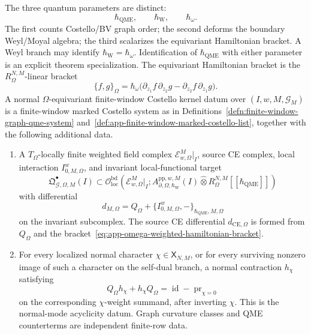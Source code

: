 \begin{defn}
  The three quantum parameters are distinct:
  \[
    \hbar_{\mathrm{QME}},\qquad
    \hbar_{\mathrm{W}},\qquad
    \hbar_\omega .
  \]
  The first counts Costello/BV graph order; the second deforms the
  boundary Weyl/Moyal algebra; the third scalarizes the equivariant
  Hamiltonian bracket.  A Weyl branch may identify
  \(\hbar_{\mathrm{W}}=\hbar_\omega\).  Identification of
  \(\hbar_{\mathrm{QME}}\) with either parameter is an explicit theorem
  specialization.  The equivariant Hamiltonian bracket is the
  \(R_\Omega^{N,M}\)-linear bracket
  \[
    \{f,g\}_\Omega
      =
    \hbar_\omega
    \bigl(
      \partial_{z_1}f\,\partial_{z_2}g
      -
      \partial_{z_2}f\,\partial_{z_1}g
    \bigr).
    \label{eq:app-omega-weighted-hamiltonian-bracket}
  \]
  A normal \(\Omega\)-equivariant finite-window Costello kernel datum over
  \((I,w,M,\mathcal G_M)\) is a finite-window marked Costello system as in
  Definitions~\ref{defn:finite-window-graph-qme-system}
  and~\ref{def:app-finite-window-marked-costello-list}, together with the
  following additional data.
  \begin{enumerate}[label={(\(\Omega\arabic*\))}]
    \item A \(T_\Omega\)-locally finite weighted field complex
      \(\mathcal E^{M}_{w,\Omega}|_I\), source CE complex, local
      interaction \(I^w_{0,M,\Omega}\), and invariant local-functional
      target
      \[
        \mathfrak Q^\bullet_{\mathcal G,\Omega,M}(I)
        \subset
        \mathcal O^{\mathrm{bd}}_{\mathrm{loc}}
          (\mathcal E^{M}_{w,\Omega}|_I;
           A_{\partial,\Omega,\hbar_{\mathrm{W}}}^{\mathrm{pp},w,M}(I)
           \widehat\otimes R_\Omega^{N,M}
           [[\hbar_{\mathrm{QME}}]])
      \]
      with differential
      \[
        d_{M,\Omega}
          =
        Q_\Omega+
        \{I^w_{0,M,\Omega},-\}_{\hbar_{\mathrm{QME}},M,\Omega}
      \]
      on the invariant subcomplex.  The source CE differential
      \(d_{\mathrm{CE},\Omega}\) is formed from \(Q_\Omega\) and
      the bracket~\eqref{eq:app-omega-weighted-hamiltonian-bracket}.

    \item For every localized normal character
      \(\chi\in\mathsf X_{N,M}\), or for every surviving nonzero image of
      such a character on the self-dual branch, a normal contraction
      \(h_\chi\) satisfying
      \[
        Q_\Omega h_\chi+h_\chi Q_\Omega
          =
        \operatorname{id}-\operatorname{pr}_{\chi=0}
	      \]
	      on the corresponding \(\chi\)-weight summand, after inverting
	      \(\chi\).  This is the normal-mode acyclicity datum.  Graph
	      curvature classes and QME counterterms are independent
	      finite-row data.


\end{enumerate}
\end{defn}
